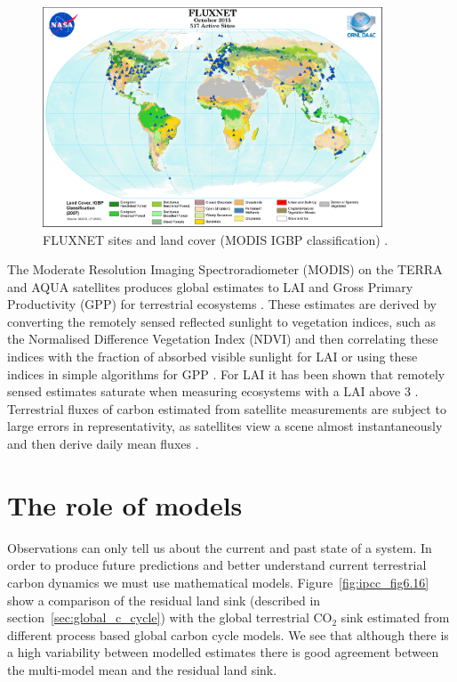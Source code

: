 \documentclass[11pt]{article}
\begin{document}
\begin{figure}[ht]
\centering
\includegraphics[width=0.9\textwidth]{FluxNetworkMODIS_IGBP_10-2015.png}
\caption{FLUXNET sites and land cover (MODIS IGBP classification) \citep{fluxnetsite2013}.}
\label{fig:fluxnet_2015}
\end{figure}

The Moderate Resolution Imaging Spectroradiometer (MODIS) on the TERRA and AQUA satellites produces global estimates to LAI and Gross Primary Productivity (GPP) for terrestrial ecosystems \citep{running2004continuous}. These estimates are derived by converting the remotely sensed reflected sunlight to vegetation indices, such as the Normalised Difference Vegetation Index (NDVI) and then correlating these indices with the fraction of absorbed visible sunlight for LAI or using these indices in simple algorithms for GPP \citep{yuan2007deriving}. For LAI it has been shown that remotely sensed estimates saturate when measuring ecosystems with a LAI above 3 \citep{myneni2002global}. Terrestrial fluxes of carbon estimated from satellite measurements are subject to large errors in representativity, as satellites view a scene almost instantaneously and then derive daily mean fluxes \citep{baldocchi2008turner}. 

\section{The role of models}

Observations can only tell us about the current and past state of a system. In order to produce future predictions and better understand current terrestrial carbon dynamics we must use mathematical models. Figure~\ref{fig:ipcc_fig6.16} show a comparison of the residual land sink (described in section~\ref{sec:global_c_cycle}) with the global terrestrial CO\(_{2}\) sink estimated from different process based global carbon cycle models. We see that although there is a high variability between modelled estimates there is good agreement between the multi-model mean and the residual land sink. 
\end{document}
